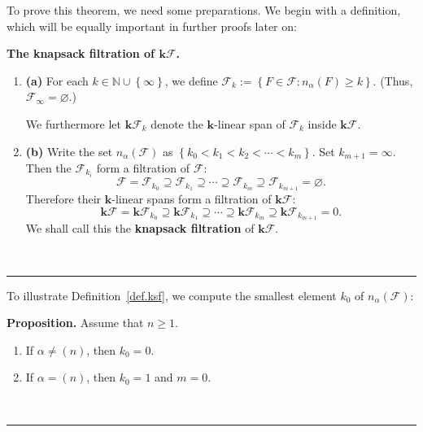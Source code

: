 \documentclass[12pt]{article}
\theoremstyle{definition}%
\newtheorem{prop}[thm]{Proposition}
\theoremstyle{definition}%
\newtheorem{defn}[thm]{Definition}
\theoremstyle{remark}%
\newcommand{\tup}[1]{\left( #1 \right)}
\newcommand{\set}[1]{\left\{ #1 \right\}}
\newcommand{\NN}{\mathbb{N}}
\newcommand{\kk}{\mathbf{k}}
\newcommand{\kf}{\kk\mathcal{F}}
\newcommand{\CF}{\mathcal{F}}
\newcommand{\na}{n_{ \alpha } }%
\newcommand{\defin}[1]{\textbf{#1}}
\newenvironment{prop}[1][Proposition]{\noindent\textbf{#1.} }{\ \rule{0.5em}{0.5em}}
\newenvironment{defn}[1][Definition]{\noindent\textbf{#1.} }{\ \rule{0.5em}{0.5em}}
\begin{document}
To prove this theorem, we need some preparations.
We begin with a definition, which will be equally important in further proofs later on:

\begin{defn}[The knapsack filtration of $\kf$]
    \label{def.ksf}\ %
    \begin{enumerate}[]
        \item\textbf{(a)} For each $k \in \NN \cup \set{\infty}$, we define
		$\CF_{k} := \set{F \in \CF : \na\tup{F} \ge k}$.
		(Thus, $\CF_\infty = \varnothing$.)
		
		We furthermore let $\kf_k$ denote the $\kk$-linear span of $\CF_k$ inside $\kf$.
		
        \item\textbf{(b)} Write the set $ \na\tup{ \CF } $ as $ \set{k_0 < k_1 < k_2 < \cdots < k_m} $.
        Set $k_{m+1} = \infty$.
        Then the $\CF_{k_i}$ form a filtration of $\CF$:
            \[
            \CF = \CF_{k_{0}} \supseteq \CF_{k_{1}} \supseteq \cdots \supseteq \CF_{k_{m}} \supseteq \CF_{k_{m+1}} = \varnothing.
            \]
        Therefore their $\kk$-linear spans form a filtration of $\kf$:
            \[
            \kf = \kf_{k_{0}} \supseteq \kf_{k_{1}} \supseteq \cdots \supseteq \kf_{k_{m}} \supseteq \kf_{k_{m+1}} = 0.
            \]
        We shall call this the \defin{knapsack filtration} of $\kf$.
    \end{enumerate}
\end{defn}

To illustrate Definition~\ref{def.ksf}, we compute the smallest element $k_0$ of $\na\tup{\CF}$:

\begin{prop}
\label{prop.k0}
Assume that $n \geq 1$.
\begin{enumerate}
\item[\textbf{(a)}] If $\alpha \neq \tup{n}$, then $k_0 = 0$.
\item[\textbf{(b)}] If $\alpha = \tup{n}$, then $k_0 = 1$ and $m = 0$.
\end{enumerate}
\end{prop}
\end{document}

